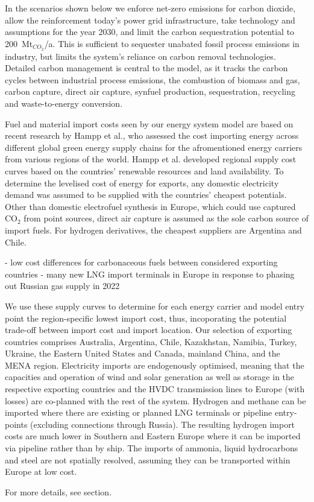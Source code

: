 In the scenarios shown below we enforce net-zero emissions for carbon dioxide,
allow the reinforcement today's power grid infrastructure, take technology and
assumptions for the year 2030\cite{dea2019}, and limit the carbon sequestration
potential to 200~Mt$_{CO_2}$/a. This is sufficient to sequester unabated fossil
process emissions in industry, but limits the system's reliance on carbon
removal technologies. Detailed carbon management is central to the model, as it
tracks the carbon cycles between industrial process emissions, the combustion of
biomass and gas, carbon capture, direct air capture, synfuel production,
sequestration, recycling and waste-to-energy conversion. 

Fuel and material import costs seen by our energy system model are based on recent research
by Hampp et al.\cite{hamppImportOptions2021}, who assessed the cost importing
energy across different global green energy supply chains for the afromentioned
energy carriers from various regions of the world. Hampp et
al.\cite{hamppImportOptions2021} developed regional supply cost curves based on
the countries' renewable resources and land availability. To determine the
levelised cost of energy for exports, any domestic electricity demand was
assumed to be supplied with the countries' cheapest potentials. Other than
domestic electrofuel synthesis in Europe, which could use captured CO$_2$ from
point sources, direct air capture is assumed as the sole carbon source of import
fuels. For hydrogen derivatives, the cheapest suppliers are Argentina and Chile.

- low cost differences for carbonaceous fuels between considered exporting countries
- many new LNG import terminals in Europe in response to phasing out Russian gas supply in 2022

We use these supply curves to determine for each energy carrier and model entry
point the region-specific lowest import cost, thus, incoporating the potential
trade-off between import cost and import location. Our selection of exporting
countries comprises Australia, Argentina, Chile, Kazakhstan, Namibia, Turkey,
Ukraine, the Eastern United States and Canada, mainland China, and the MENA
region. Electricity imports are endogenously optimised, meaning that the
capacities and operation of wind and solar generation as well as storage in the
respective exporting countries and the HVDC transmission lines to Europe (with
losses) are co-planned with the rest of the system. Hydrogen and methane can be
imported where there are existing or planned LNG terminals or pipeline
entry-points (excluding connections through Russia). The resulting hydrogen
import costs are much lower in Southern and Eastern Europe where it can be
imported via pipeline rather than by ship. The imports of ammonia, liquid
hydrocarbons and steel are not spatially resolved, assuming they can be
transported within Europe at low cost.

For more details, see  section.